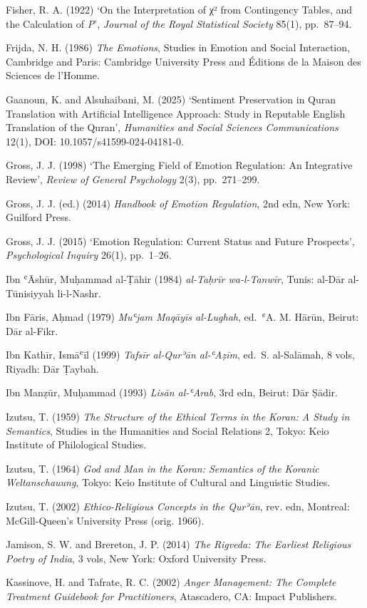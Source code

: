 Fisher, R. A. (1922) `On the Interpretation of χ² from Contingency
Tables, and the Calculation of \emph{P}', \emph{Journal of the Royal
Statistical Society} 85(1), pp.~87--94.

Frijda, N. H. (1986) \emph{The Emotions}, Studies in Emotion and Social
Interaction, Cambridge and Paris: Cambridge University Press and
Éditions de la Maison des Sciences de l'Homme.

Gaanoun, K. and Alsuhaibani, M. (2025) `Sentiment Preservation in Quran
Translation with Artificial Intelligence Approach: Study in Reputable
English Translation of the Quran', \emph{Humanities and Social Sciences
Communications} 12(1), DOI: 10.1057/s41599-024-04181-0.

Gross, J. J. (1998) `The Emerging Field of Emotion Regulation: An
Integrative Review', \emph{Review of General Psychology} 2(3),
pp.~271--299.

Gross, J. J. (ed.) (2014) \emph{Handbook of Emotion Regulation}, 2nd
edn, New York: Guilford Press.

Gross, J. J. (2015) `Emotion Regulation: Current Status and Future
Prospects', \emph{Psychological Inquiry} 26(1), pp.~1--26.

Ibn ʿĀshūr, Muḥammad al-Ṭāhir (1984) \emph{al-Taḥrīr wa-l-Tanwīr},
Tunis: al-Dār al-Tūnisiyyah li-l-Nashr.

Ibn Fāris, Aḥmad (1979) \emph{Muʿjam Maqāyīs al-Lughah}, ed.~ʿA. M.
Hārūn, Beirut: Dār al-Fikr.

Ibn Kathīr, Ismāʿīl (1999) \emph{Tafsīr al-Qurʾān al-ʿAẓīm}, ed.~S.
al-Salāmah, 8 vols, Riyadh: Dār Ṭaybah.

Ibn Manẓūr, Muḥammad (1993) \emph{Lisān al-ʿArab}, 3rd edn, Beirut: Dār
Ṣādir.

Izutsu, T. (1959) \emph{The Structure of the Ethical Terms in the Koran:
A Study in Semantics}, Studies in the Humanities and Social Relations 2,
Tokyo: Keio Institute of Philological Studies.

Izutsu, T. (1964) \emph{God and Man in the Koran: Semantics of the
Koranic Weltanschauung}, Tokyo: Keio Institute of Cultural and
Linguistic Studies.

Izutsu, T. (2002) \emph{Ethico-Religious Concepts in the Qurʾān}, rev.
edn, Montreal: McGill-Queen's University Press (orig. 1966).

Jamison, S. W. and Brereton, J. P. (2014) \emph{The Rigveda: The
Earliest Religious Poetry of India}, 3 vols, New York: Oxford University
Press.

Kassinove, H. and Tafrate, R. C. (2002) \emph{Anger Management: The
Complete Treatment Guidebook for Practitioners}, Atascadero, CA: Impact
Publishers.

